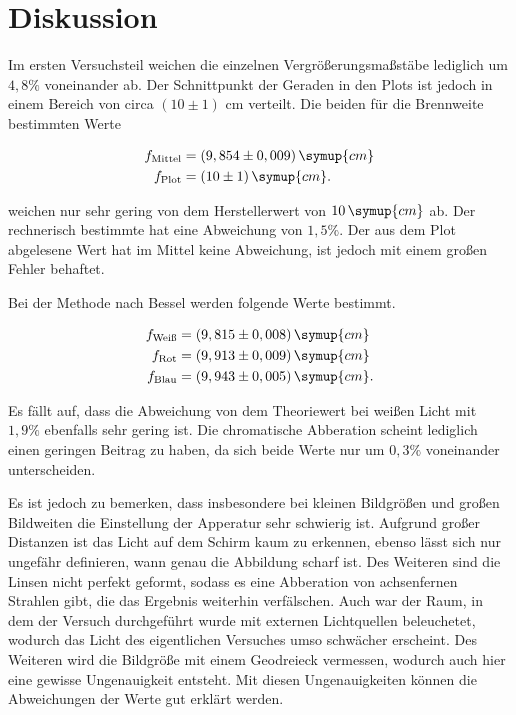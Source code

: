\section{Diskussion}
\label{sec:Diskussion}

Im ersten Versuchsteil weichen die einzelnen Vergrößerungsmaßstäbe lediglich um $4,8\%$ voneinander ab.
Der Schnittpunkt der Geraden in den Plots ist jedoch in einem Bereich von circa $(10 \pm 1)$ cm verteilt.
Die beiden für die Brennweite bestimmten Werte

\begin{align*}
    f_\text{Mittel} &= (9,854 \pm 0,009) \, \symup{cm}\\
    f_\text{Plot} &= (10 \pm 1) \, \symup{cm}.
\end{align*}

weichen nur sehr gering von dem Herstellerwert von $10 \, \symup{cm}$ ab.
Der rechnerisch bestimmte hat eine Abweichung von $1,5 \%$. Der aus dem Plot abgelesene Wert hat im Mittel keine Abweichung, ist jedoch mit einem großen Fehler behaftet.

Bei der Methode nach Bessel werden folgende Werte bestimmt.

\begin{align*}
  f_\text{Weiß} &= (9,815 \pm 0,008) \, \symup{cm}\\
  f_\text{Rot} &=  (9,913 \pm 0,009) \, \symup{cm}\\
  f_\text{Blau} &= (9,943 \pm 0,005) \, \symup{cm}.
\end{align*}

Es fällt auf, dass die Abweichung von dem Theoriewert bei weißen Licht mit $1,9 \%$ ebenfalls sehr gering ist.
Die chromatische Abberation scheint lediglich einen geringen Beitrag zu haben, da sich beide Werte nur um $0,3 \%$ voneinander unterscheiden.

Es ist jedoch zu bemerken, dass insbesondere bei kleinen Bildgrößen und großen Bildweiten die Einstellung der Apperatur sehr schwierig ist.
Aufgrund großer Distanzen ist das Licht auf dem Schirm kaum zu erkennen, ebenso lässt sich nur ungefähr definieren, wann genau die Abbildung scharf ist.
Des Weiteren sind die Linsen nicht perfekt geformt, sodass es eine Abberation von achsenfernen Strahlen gibt, die das Ergebnis weiterhin verfälschen.
Auch war der Raum, in dem der Versuch durchgeführt wurde mit externen Lichtquellen beleuchetet, wodurch das Licht des eigentlichen Versuches umso schwächer erscheint.
Des Weiteren wird die Bildgröße mit einem Geodreieck vermessen, wodurch auch hier eine gewisse Ungenauigkeit entsteht.
Mit diesen Ungenauigkeiten können die Abweichungen der Werte gut erklärt werden.

